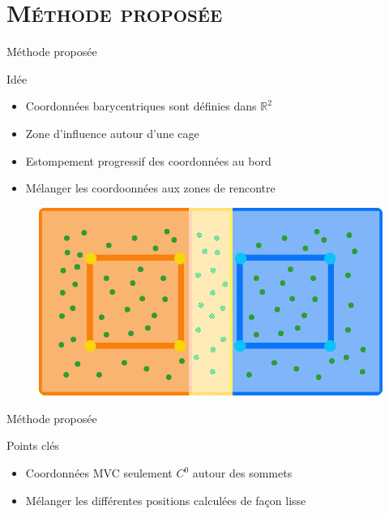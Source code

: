 \documentclass[xcolor=x11names,compress]{beamer}
\renewcommand{\(}{\begin{columns}} \renewcommand{\)}{\end{columns}}
\newcommand{\<}[1]{\begin{column}{#1}} \renewcommand{\>}{\end{column}}
\begin{document}
\section{\scshape Méthode proposée}

\begin{frame}{Méthode proposée}
  \begin{block}{Idée}
    \begin{itemize}
    \item Coordonnées barycentriques sont définies dans $\mathbb{R}^2$
    \item Zone d'influence autour d'une cage
    \item Estompement progressif des coordonnées au bord
    \item Mélanger les coordoonnées aux zones de rencontre
    \end{itemize}
  \end{block}
  \begin{figure}[h]
    \includegraphics[scale=0.2]{bordure-cage}
  \end{figure}
\end{frame}

\begin{frame}{Méthode proposée}
  \begin{alertblock}{Points clés}
    \begin{itemize}
    \item Coordonnées MVC seulement $C^0$ autour des sommets
    \item Mélanger les différentes positions calculées de façon lisse
    \end{itemize}
  \end{alertblock}
\end{frame}

\end{document}
